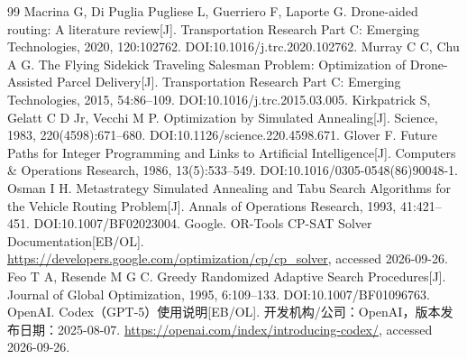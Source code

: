 \begin{thebibliography}{99}
 Macrina G, Di Puglia Pugliese L, Guerriero F, Laporte G. Drone-aided routing: A literature review[J]. Transportation Research Part C: Emerging Technologies, 2020, 120:102762. DOI:10.1016/j.trc.2020.102762.
 Murray C C, Chu A G. The Flying Sidekick Traveling Salesman Problem: Optimization of Drone-Assisted Parcel Delivery[J]. Transportation Research Part C: Emerging Technologies, 2015, 54:86--109. DOI:10.1016/j.trc.2015.03.005.
 Kirkpatrick S, Gelatt C D Jr, Vecchi M P. Optimization by Simulated Annealing[J]. Science, 1983, 220(4598):671--680. DOI:10.1126/science.220.4598.671.
 Glover F. Future Paths for Integer Programming and Links to Artificial Intelligence[J]. Computers \& Operations Research, 1986, 13(5):533--549. DOI:10.1016/0305-0548(86)90048-1.
 Osman I H. Metastrategy Simulated Annealing and Tabu Search Algorithms for the Vehicle Routing Problem[J]. Annals of Operations Research, 1993, 41:421--451. DOI:10.1007/BF02023004.
 Google. OR-Tools CP-SAT Solver Documentation[EB/OL]. \url{https://developers.google.com/optimization/cp/cp_solver}, accessed 2026-09-26.
 Feo T A, Resende M G C. Greedy Randomized Adaptive Search Procedures[J]. Journal of Global Optimization, 1995, 6:109--133. DOI:10.1007/BF01096763.
 OpenAI. Codex（GPT-5）使用说明[EB/OL]. 开发机构/公司：OpenAI，版本发布日期：2025-08-07. \url{https://openai.com/index/introducing-codex/}, accessed 2026-09-26.
\end{thebibliography}
